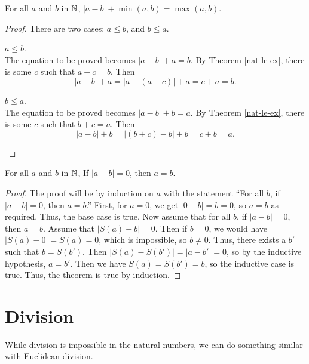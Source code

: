 \documentclass[../math.tex]{subfiles}
\begin{document}
\begin{theorem} \label{nat-abs-minus-min}
    For all $a$ and $b$ in $\mathbb{N}$, $|a - b| + \min(a, b) = \max(a, b)$.
\end{theorem}
\begin{proof}
    There are two cases: $a \leq b$, and $b \leq a$.
    \begin{case} $a \leq b$. \\
        The equation to be proved becomes $|a - b| + a = b$.  By Theorem
        \ref{nat-le-ex}, there is some $c$ such that $a + c = b$.  Then
        \[
            |a - b| + a = |a - (a + c)| + a = c + a = b.
        \]
    \end{case}
    \begin{case} $b \leq a$. \\
        The equation to be proved becomes $|a - b| + b = a$.  By Theorem
        \ref{nat-le-ex}, there is some $c$ such that $b + c = a$.  Then
        \[
            |a - b| + b = |(b + c) - b| + b = c + b = a.
        \]
    \end{case}
\end{proof}

\begin{theorem} \label{nat-abs-minus-zero}
    For all $a$ and $b$ in $\mathbb{N}$, If $|a - b| = 0$, then $a = b$.
\end{theorem}
\begin{proof}
    The proof will be by induction on $a$ with the statement ``For all $b$, if
    $|a - b| = 0$, then $a = b$.''  First, for $a = 0$, we get $|0 - b| = b =
    0$, so $a = b$ as required.  Thus, the base case is true.  Now assume that
    for all $b$, if $|a - b| = 0$, then $a = b$.  Assume that $|S(a) - b| = 0$.
    Then if $b = 0$, we would have $|S(a) - 0| = S(a) = 0$, which is impossible,
    so $b \neq 0$.  Thus, there exists a $b'$ such that $b = S(b')$.  Then
    $|S(a) - S(b')| = |a - b'| = 0$, so by the inductive hypothesis, $a = b'$.
    Then we have $S(a) = S(b') = b$, so the inductive case is true.  Thus, the
    theorem is true by induction.
\end{proof}

\section{Division}

While division is impossible in the natural numbers, we can do something similar
with Euclidean division.
\end{document}
